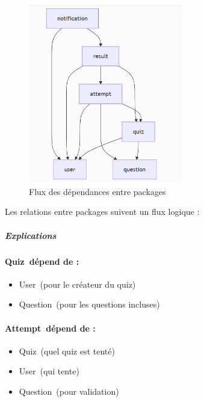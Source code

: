 \documentclass[12pt,a4paper,twoside]{report}
\begin{document}
\begin{figure}[H]
\centering
\includegraphics[width=0.6\textwidth]{latex_media/media/image18.png}
\caption{Flux des dépendances entre packages}
\label{fig:flux-dependances}
\end{figure}

Les
relations entre packages suivent un flux logique :

\hypertarget{explications}{%
\subparagraph{Explications~}\label{explications}}

\hypertarget{quiz-duxe9pend-de}{%
\paragraph{Quiz~dépend de :}\label{quiz-duxe9pend-de}}

\begin{itemize}
\item
  User~(pour le créateur du quiz)
\item
  Question~(pour les questions incluses)
\end{itemize}

\hypertarget{attempt-duxe9pend-de}{%
\paragraph{Attempt~dépend de :}\label{attempt-duxe9pend-de}}

\begin{itemize}
\item
  Quiz~(quel quiz est tenté)
\item
  User~(qui tente)
\item
  Question~(pour validation)
\end{itemize}
\end{document}
